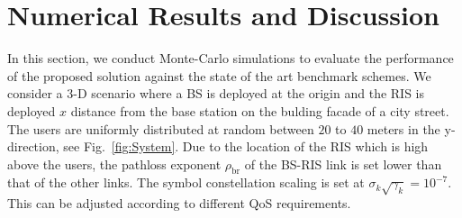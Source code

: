 \documentclass[10pt,conference]{IEEEtran}
\begin{document}
\section{Numerical Results and Discussion}\label{sec:Results}
In this section, we conduct Monte-Carlo simulations to evaluate the performance of the proposed solution against the state of the art benchmark schemes. We consider a 3-D scenario where a BS is deployed at the origin and the RIS is deployed $x$ distance from the base station on the bulding facade of a city street. The users are uniformly distributed at random between $20$ to $40$ meters in the  y-direction, see Fig.~\ref{fig:System}. Due to the location of the RIS which is high above the users, the pathloss exponent $\rho_{\textrm{br}}$ of the BS-RIS link is set lower than that of the other links. The symbol constellation scaling is set at $\sigma_k\sqrt{\gamma_k}= 10^{-7}$. This can be adjusted according to different QoS requirements.
\end{document}
